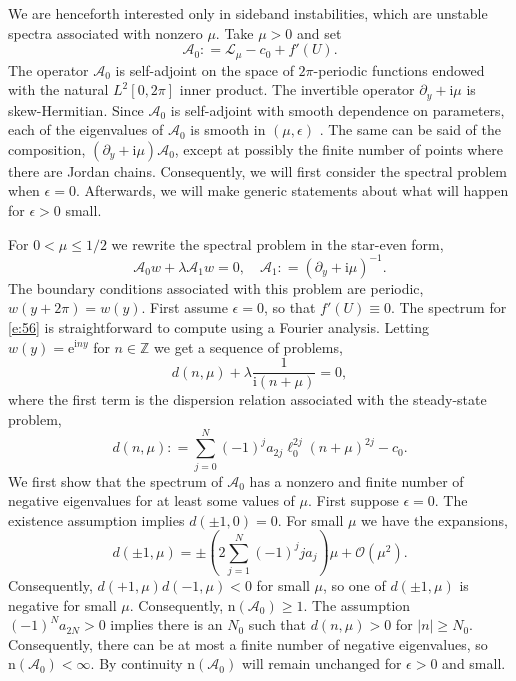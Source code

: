 \documentclass[review,onefignum,onetabnum]{siamart171218}
\newcommand{\Z}{\mathbb{Z}}
\def\coloneqq{\mathrel{\mathop:}=}
\newcommand{\rme}{\mathrm{e}}
\newcommand{\rmi}{\mathrm{i}}
\newcommand{\rmn}{\mathrm{n}}
\newcommand{\calA}{\mathcal{A}}
\newcommand{\calL}{\mathcal{L}}
\newcommand{\calO}{\mathcal{O}}
\begin{document}
We are henceforth interested only in sideband instabilities, which are unstable spectra associated with nonzero $\mu$. Take $\mu>0$
and set
\[
\calA_0\coloneqq\calL_\mu-c_0+f'(U).
\]
The operator $\calA_0$ is self-adjoint on the space of $2\pi$-periodic
functions endowed with the natural $L^2[0,2\pi]$ inner product.
The invertible operator $\partial_y+\rmi\mu$ is skew-Hermitian.  Since $\calA_0$ is self-adjoint with smooth dependence on parameters, each of the eigenvalues of $\calA_0$ is smooth in $(\mu,\epsilon)$ \cite{kato:ptf80}. The same can be said of the composition, $(\partial_y+\rmi\mu)\calA_0$, except at possibly the finite number of points where there are Jordan chains.
Consequently, we will first consider the spectral problem
when $\epsilon=0$. Afterwards, we will make generic statements about what
will happen for $\epsilon>0$ small.

For $0<\mu\le1/2$ we rewrite the spectral problem in the star-even form,
\begin{equation}\label{e:56}
\calA_0w+\lambda\calA_1w=0,\quad
\calA_1\coloneqq\left(\partial_y+\rmi\mu\right)^{-1}.
\end{equation}
The boundary conditions associated with this problem are periodic,
$w(y+2\pi)=w(y)$.
First assume $\epsilon=0$, so that $f'(U)\equiv0$.
The spectrum for \cref{e:56} is straightforward to compute using a Fourier analysis. Letting
$w(y)=\rme^{\rmi ny}$ for $n\in\Z$ we get a sequence of problems,
\begin{equation}\label{e:57}
d(n,\mu)+\lambda\frac{1}{\rmi(n+\mu)}=0,
\end{equation}
where the first term is the dispersion relation associated with the
steady-state problem,
\[
d(n,\mu)\coloneqq\sum_{j=0}^N(-1)^ja_{2j}\ell_0^{2j}(n+\mu)^{2j}-c_0.
\]
We first show that the spectrum of $\calA_0$ has a nonzero and finite number of negative eigenvalues for at least some values of $\mu$.
First suppose $\epsilon=0$.
The existence assumption implies $d(\pm1,0)=0$. For small $\mu$ we have the
expansions,
\begin{equation}\label{e:58}
d(\pm1,\mu)=\pm\left(2\sum_{j=1}^N(-1)^jja_j\right)\mu+\calO(\mu^2).
\end{equation}
Consequently, $d(+1,\mu)d(-1,\mu)<0$ for small $\mu$, so one of $d(\pm1,\mu)$ is negative for small $\mu$. Consequently, $\rmn(\calA_0)\ge1$. The assumption $(-1)^Na_{2N}>0$ implies there
is an $N_0$ such that $d(n,\mu)>0$ for $|n|\ge N_0$. Consequently, there can be at most a finite number of negative eigenvalues, so
$\rmn(\calA_0)<\infty$. By continuity $\rmn(\calA_0)$ will remain unchanged for $\epsilon>0$ and small.
\end{document}
